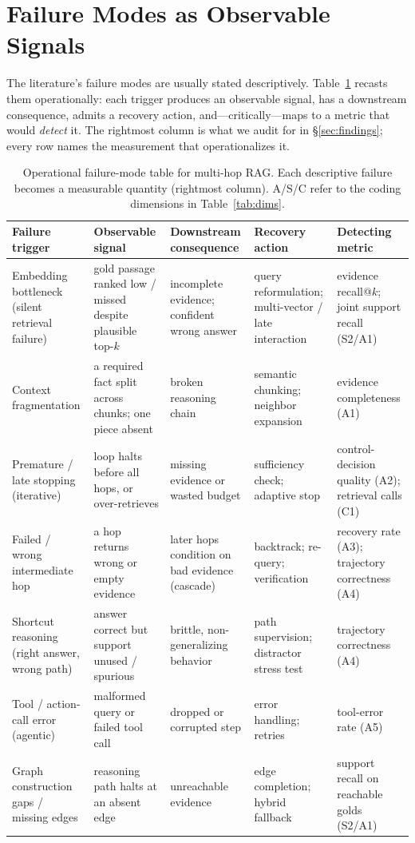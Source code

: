 \documentclass[11pt]{article}
\begin{document}
\section{Failure Modes as Observable Signals}
\label{sec:failuremodes}
The literature's failure modes are usually stated descriptively. Table~\ref{tab:operational} recasts
them operationally: each trigger produces an observable signal, has a downstream consequence, admits a
recovery action, and---critically---maps to a metric that would \emph{detect} it. The rightmost column
is what we audit for in \S\ref{sec:findings}; every row names the measurement that operationalizes it.

\begin{table}[t]\centering\footnotesize
\caption{Operational failure-mode table for multi-hop RAG. Each descriptive failure becomes a
measurable quantity (rightmost column). A/S/C refer to the coding dimensions in Table~\ref{tab:dims}.}
\label{tab:operational}
\begin{tabular}{@{}p{2.6cm}p{2.65cm}p{2.5cm}p{2.55cm}p{2.25cm}@{}}
\toprule
\textbf{Failure trigger} & \textbf{Observable signal} & \textbf{Downstream consequence} & \textbf{Recovery action} & \textbf{Detecting metric} \\
\midrule
Embedding bottleneck (silent retrieval failure) & gold passage ranked low / missed despite plausible top-$k$ & incomplete evidence; confident wrong answer & query reformulation; multi-vector / late interaction & evidence recall@$k$; joint support recall (S2/A1) \\
\midrule
Context fragmentation & a required fact split across chunks; one piece absent & broken reasoning chain & semantic chunking; neighbor expansion & evidence completeness (A1) \\
\midrule
Premature / late stopping (iterative) & loop halts before all hops, or over-retrieves & missing evidence or wasted budget & sufficiency check; adaptive stop & control-decision quality (A2); retrieval calls (C1) \\
\midrule
Failed / wrong intermediate hop & a hop returns wrong or empty evidence & later hops condition on bad evidence (cascade) & backtrack; re-query; verification & recovery rate (A3); trajectory correctness (A4) \\
\midrule
Shortcut reasoning (right answer, wrong path) & answer correct but support unused / spurious & brittle, non-generalizing behavior & path supervision; distractor stress test & trajectory correctness (A4) \\
\midrule
Tool / action-call error (agentic) & malformed query or failed tool call & dropped or corrupted step & error handling; retries & tool-error rate (A5) \\
\midrule
Graph construction gaps / missing edges & reasoning path halts at an absent edge & unreachable evidence & edge completion; hybrid fallback & support recall on reachable golds (S2/A1) \\
\bottomrule
\end{tabular}
\end{table}
\end{document}
